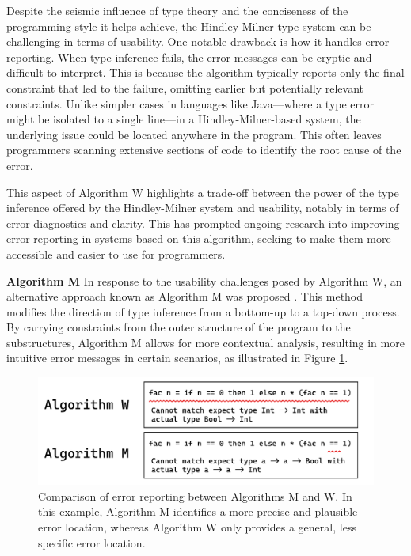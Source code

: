 Despite the seismic influence of type theory and the conciseness of the programming style it helps achieve,  the Hindley-Milner type system can be challenging in terms of usability. One notable drawback is how it handles error reporting. When type inference fails, the error messages can be cryptic and difficult to interpret. This is because the algorithm typically reports only the final constraint that led to the failure, omitting earlier but potentially relevant constraints. Unlike simpler cases in languages like Java—where a type error might be isolated to a single line—in a Hindley-Milner-based system, the underlying issue could be located anywhere in the program. This often leaves programmers scanning extensive sections of code to identify the root cause of the error. 

This aspect of Algorithm W highlights a trade-off between the power of the type inference offered by the Hindley-Milner system and usability, notably in terms of error diagnostics and clarity. This has prompted ongoing research into improving error reporting in systems based on this algorithm, seeking to make them more accessible and easier to use for programmers.

\textbf{Algorithm M} 
In response to the usability challenges posed by Algorithm W, an alternative approach known as Algorithm M was proposed \cite{Lee1998-fx}. This method modifies the direction of type inference from a bottom-up to a top-down process. By carrying constraints from the outer structure of the program to the substructures, Algorithm M allows for more contextual analysis, resulting in more intuitive error messages in certain scenarios, as illustrated in Figure \ref{fig:algorithm-m-1}. 

\begin{figure}[hbt]
  \centering
  \includegraphics[width=0.8\linewidth]{AlgorithmWM1.pdf}
  \caption[Comparison of error reporting between Algorithms M and W]{
    \label{fig:algorithm-m-1}
    Comparison of error reporting between Algorithms M and W. In this example, Algorithm M identifies a more precise and plausible error location, whereas Algorithm W only provides a general, less specific error location.}
\end{figure}


